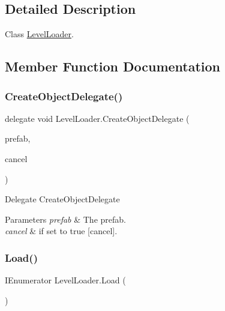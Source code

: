 \subsection{Detailed Description}
Class \hyperlink{class_level_loader}{Level\+Loader}. 



\subsection{Member Function Documentation}
\mbox{\label{class_level_loader_a251c136aac0e65fff5fef1c339fad356}} 
\subsubsection{\texorpdfstring{Create\+Object\+Delegate()}{CreateObjectDelegate()}}
{\footnotesize\ttfamily delegate void Level\+Loader.\+Create\+Object\+Delegate (\begin{DoxyParamCaption}\item[{Game\+Object}]{prefab,  }\item[{ref bool}]{cancel }\end{DoxyParamCaption})}



Delegate Create\+Object\+Delegate 


\begin{DoxyParams}{Parameters}
{\em prefab} & The prefab.\\
\hline
{\em cancel} & if set to {\ttfamily true} \mbox{[}cancel\mbox{]}.\\
\hline
\end{DoxyParams}
\mbox{\label{class_level_loader_a9db9397a70b0263acaa645576258777b}} 
\subsubsection{\texorpdfstring{Load()}{Load()}\hspace{0.1cm}{\footnotesize\ttfamily [1/2]}}
{\footnotesize\ttfamily I\+Enumerator Level\+Loader.\+Load (\begin{DoxyParamCaption}{ }\end{DoxyParamCaption})\hspace{0.3cm}{\ttfamily [inline]}}



